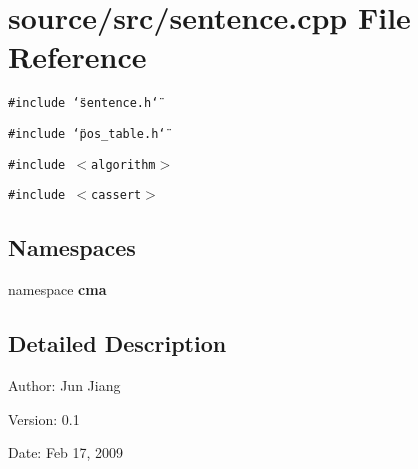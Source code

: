 \section{source/src/sentence.cpp File Reference}
\label{sentence_8cpp}
{\tt \#include \char`\"{}sentence.h\char`\"{}}\par
{\tt \#include \char`\"{}pos\_\-table.h\char`\"{}}\par
{\tt \#include $<$algorithm$>$}\par
{\tt \#include $<$cassert$>$}\par
\subsection*{Namespaces}
\begin{CompactItemize}
\item 
namespace \textbf{cma}
\end{CompactItemize}


\subsection{Detailed Description}
\begin{Desc}
\item[Author:]Jun Jiang \end{Desc}
\begin{Desc}
\item[Version:]0.1 \end{Desc}
\begin{Desc}
\item[Date:]Feb 17, 2009 \end{Desc}
